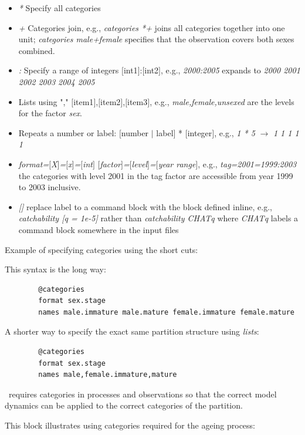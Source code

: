 \begin{itemize}
	\item \textit{*} Specify all categories
	\item \textit{+} Categories join, e.g., \textit{categories *+} joins all categories together into one unit; \textit{categories male+female}
specifies that the observation covers both sexes combined.
    \item \textit{:} Specify a range of integers $[$int1$]$:$[$int2$]$, e.g., \textit{2000:2005} expands to \textit{2000 2001 2002 2003 2004 2005}
    \item Lists using "," $[$item1$]$,$[$item2$]$,$[$item3$]$, e.g., \textit{male,female,unsexed} are the levels for the factor \textit{sex}.
    \item Repeats a number or label: $[$number $\mid$ label$]$ * $[$integer$]$, e.g., \textit{1 * 5} $\rightarrow$ \textit{1 1 1 1 1}
    \item \textit{format=$[$X$]$=$[$x$]$=$[$int$]$}   
    \textit{$[$factor$]$=$[$level$]$=$[$year range$]$}, e.g., \textit{tag=2001=1999:2003} the categories with level 2001 in the tag factor are accessible from year 1999 to 2003 inclusive.
    \item \textit{[]} replace label to a command block with the block defined inline, e.g., \textit{catchability [q = 1e-5]} rather than \textit{catchability CHATq} where \textit{CHATq} labels a command block somewhere in the input files
\end{itemize}


Example of specifying categories using the short cuts:

This syntax is the long way:
{\small{\begin{verbatim}
		@categories
		format sex.stage
		names male.immature male.mature female.immature female.mature
\end{verbatim}}}

A shorter way to specify the exact same partition structure  using \textit{lists}:

{\small{\begin{verbatim}
		@categories
		format sex.stage
		names male,female.immature,mature
\end{verbatim}}}

\CNAME\ requires categories in processes and observations so that the correct model dynamics can be applied to the correct categories of the partition.

This block illustrates using categories required for the ageing process:


